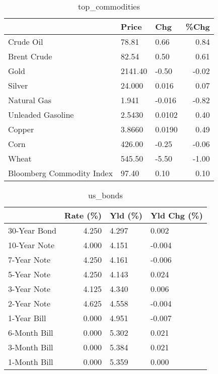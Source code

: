\documentclass{article}%
\begin{document}
\begin{table}[htbp]%
\caption{top\_commodities}%
\centering%
\begin{adjustbox}{width=1\textwidth}%
\begin{tabular}{lllr}
\toprule
                          &   Price &    Chg &  \%Chg \\
\midrule
               Crude Oil  &   78.81 &   0.66 &  0.84 \\
             Brent Crude  &   82.54 &   0.50 &  0.61 \\
                    Gold  & 2141.40 &  -0.50 & -0.02 \\
                  Silver  &  24.000 &  0.016 &  0.07 \\
             Natural Gas  &   1.941 & -0.016 & -0.82 \\
       Unleaded Gasoline  &  2.5430 & 0.0102 &  0.40 \\
                  Copper  &  3.8660 & 0.0190 &  0.49 \\
                    Corn  &  426.00 &  -0.25 & -0.06 \\
                   Wheat  &  545.50 &  -5.50 & -1.00 \\
Bloomberg Commodity Index &   97.40 &   0.10 &  0.10 \\
\bottomrule
\end{tabular}
%
\end{adjustbox}%
\end{table}

%


\begin{table}[htbp]%
\caption{us\_bonds}%
\centering%
\begin{adjustbox}{width=1\textwidth}%
\begin{tabular}{lrll}
\toprule
             &  Rate (\%) & Yld (\%) & Yld Chg (\%) \\
\midrule
30-Year Bond &     4.250 &   4.297 &       0.002 \\
10-Year Note &     4.000 &   4.151 &      -0.004 \\
 7-Year Note &     4.250 &   4.161 &      -0.006 \\
 5-Year Note &     4.250 &   4.143 &       0.024 \\
 3-Year Note &     4.125 &   4.340 &       0.006 \\
 2-Year Note &     4.625 &   4.558 &      -0.004 \\
 1-Year Bill &     0.000 &   4.951 &      -0.007 \\
6-Month Bill &     0.000 &   5.302 &       0.021 \\
3-Month Bill &     0.000 &   5.384 &       0.021 \\
1-Month Bill &     0.000 &   5.359 &       0.000 \\
\bottomrule
\end{tabular}
%
\end{adjustbox}%
\end{table}
\end{document}
